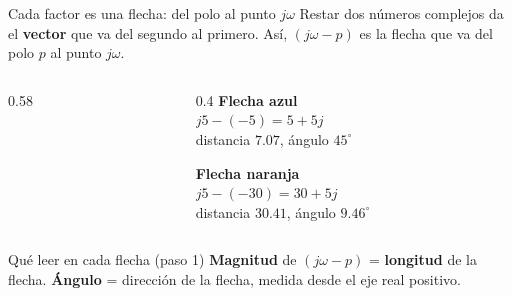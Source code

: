 \documentclass[aspectratio=169,11pt]{beamer}
\begin{document}
\begin{frame}{Cada factor es una flecha: del polo al punto $j\omega$}
  \small
  \setlength{\parskip}{3pt}
  Restar dos números complejos da el \textbf{vector} que va del segundo al primero. Así, $(j\omega-p)$ es la flecha que va del polo $p$ al punto $j\omega$.

  \begin{columns}[T]
    \begin{column}{0.58\textwidth}
      \centering
    \end{column}
    \begin{column}{0.4\textwidth}
      \textcolor{blue!70!black}{\textbf{Flecha azul}}\\
      $j5-(-5)=5+5j$\\
      distancia $7.07$, ángulo $45^\circ$

      \medskip
      \textcolor{orange!85!black}{\textbf{Flecha naranja}}\\
      $j5-(-30)=30+5j$\\
      distancia $30.41$, ángulo $9.46^\circ$
    \end{column}
  \end{columns}

  \begin{block}{Qué leer en cada flecha (paso 1)}
    \textbf{Magnitud} de $(j\omega-p)$ = \textbf{longitud} de la flecha. \quad \textbf{Ángulo} = dirección de la flecha, medida desde el eje real positivo.
  \end{block}
\end{frame}
\end{document}
